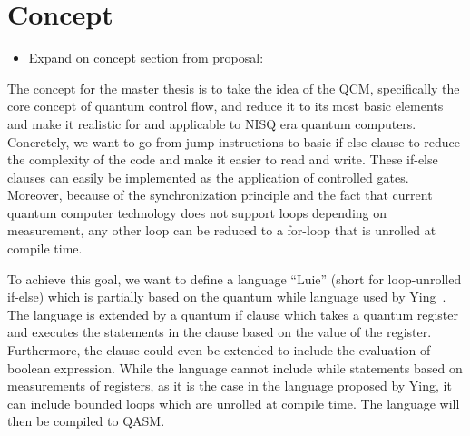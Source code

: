 \chapter{Concept}

\begin{itemize}
    \item Expand on concept section from proposal:
\end{itemize}

The concept for the master thesis is to take the idea of the QCM, specifically the core concept of quantum control flow, and reduce it to its most basic elements and make it realistic for and applicable to NISQ era quantum computers. Concretely, we want to go from jump instructions to basic if-else clause to reduce the complexity of the code and make it easier to read and write. These if-else clauses can easily be implemented as the application of controlled gates. Moreover, because of the synchronization principle and the fact that current quantum computer technology does not support loops depending on measurement, any other loop can be reduced to a for-loop that is unrolled at compile time.

To achieve this goal, we want to define a language ``Luie'' (short for loop-unrolled if-else) which is partially based on the quantum while language used by Ying~\cite{Ying11}. The language is extended by a quantum if clause which takes a quantum register and executes the statements in the clause based on the value of the register. Furthermore, the clause could even be extended to include the evaluation of boolean expression. While the language cannot include while statements based on measurements of registers, as it is the case in the language proposed by Ying, it can include bounded loops which are unrolled at compile time. The language will then be compiled to QASM.
